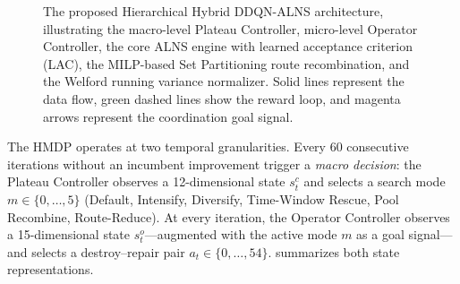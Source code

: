 \documentclass[conference]{IEEEtran}
\begin{document}
\begin{figure}[!t]
{%
}
\caption{The proposed Hierarchical Hybrid DDQN-ALNS architecture, illustrating the macro-level Plateau Controller, micro-level Operator Controller, the core ALNS engine with learned acceptance criterion (LAC), the MILP-based Set Partitioning route recombination, and the Welford running variance normalizer. Solid lines represent the data flow, green dashed lines show the reward loop, and magenta arrows represent the coordination goal signal.}
\label{fig:hybrid_architecture}
\end{figure}

The HMDP operates at two temporal granularities.  Every $60$ consecutive
iterations without an incumbent improvement trigger a \emph{macro decision}:
the Plateau Controller observes a 12-dimensional state $s_t^c$ and selects a
search mode $m\in\{0,\dots,5\}$ (Default, Intensify, Diversify, Time-Window
Rescue, Pool Recombine, Route-Reduce).  At every iteration, the Operator
Controller observes a 15-dimensional state $s_t^o$---augmented with the active
mode $m$ as a goal signal---and selects a destroy--repair pair
$a_t\in\{0,\dots,54\}$.   summarizes both state
representations.
\end{document}
